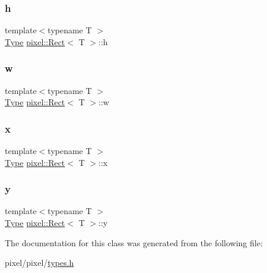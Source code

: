 \subsubsection{\texorpdfstring{h}{h}}
{\footnotesize\ttfamily template$<$typename T $>$ \\
\hyperlink{classpixel_1_1_rect_a7890b7a80decee4efccf587d4f5b13d7}{Type} \hyperlink{classpixel_1_1_rect}{pixel\+::\+Rect}$<$ T $>$\+::h}

\mbox{\label{classpixel_1_1_rect_a88eb5fb07e4aea4b1d9835c1da9bec0f}} 
\subsubsection{\texorpdfstring{w}{w}}
{\footnotesize\ttfamily template$<$typename T $>$ \\
\hyperlink{classpixel_1_1_rect_a7890b7a80decee4efccf587d4f5b13d7}{Type} \hyperlink{classpixel_1_1_rect}{pixel\+::\+Rect}$<$ T $>$\+::w}

\mbox{\label{classpixel_1_1_rect_aa669ab32cd83ec71e5aafc37b96d7cc2}} 
\subsubsection{\texorpdfstring{x}{x}}
{\footnotesize\ttfamily template$<$typename T $>$ \\
\hyperlink{classpixel_1_1_rect_a7890b7a80decee4efccf587d4f5b13d7}{Type} \hyperlink{classpixel_1_1_rect}{pixel\+::\+Rect}$<$ T $>$\+::x}

\mbox{\label{classpixel_1_1_rect_a47576f166846e700691b44c53de3de91}} 
\subsubsection{\texorpdfstring{y}{y}}
{\footnotesize\ttfamily template$<$typename T $>$ \\
\hyperlink{classpixel_1_1_rect_a7890b7a80decee4efccf587d4f5b13d7}{Type} \hyperlink{classpixel_1_1_rect}{pixel\+::\+Rect}$<$ T $>$\+::y}



The documentation for this class was generated from the following file\+:\begin{DoxyCompactItemize}
\item 
pixel/pixel/\hyperlink{types_8h}{types.\+h}\end{DoxyCompactItemize}
